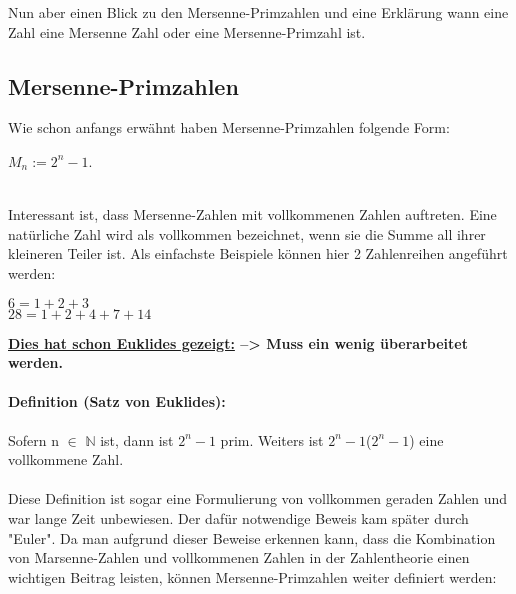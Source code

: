 \documentclass[german,12pt,a4paper]{article}
\begin{document}
Nun aber einen Blick zu den Mersenne-Primzahlen und eine Erklärung wann eine Zahl eine Mersenne Zahl oder eine Mersenne-Primzahl ist.

\subsection{Mersenne-Primzahlen}\label{Mersenne-Primzahlen}
Wie schon anfangs erwähnt haben Mersenne-Primzahlen folgende Form:\\
\begin{center}
$M_n := 2^{n}-1$.
\end{center}\
\\Interessant ist, dass Mersenne-Zahlen mit vollkommenen Zahlen auftreten.
Eine natürliche Zahl wird als vollkommen bezeichnet, wenn sie die Summe all ihrer kleineren Teiler ist.
Als einfachste Beispiele können hier 2 Zahlenreihen angeführt werden:
\begin{center}
$6 = 1+2+3$\\
$28 = 1+2+4+7+14$
\end{center}
\textbf{\underline{Dies hat schon Euklides gezeigt:} --> Muss ein wenig überarbeitet werden.}
\paragraph{Definition (Satz von Euklides):}
Sofern n $\in$ $\mathbb{N}$ ist, dann ist $2^{n}-1$ prim.
Weiters ist $2^{n}-1$($2^{n}-1$) eine vollkommene Zahl.\\
\\Diese Definition ist sogar eine Formulierung von vollkommen geraden Zahlen und war lange Zeit unbewiesen.
Der dafür notwendige Beweis kam später durch "{Euler}".
Da man aufgrund dieser Beweise erkennen kann, dass die Kombination von Marsenne-Zahlen und vollkommenen Zahlen in der Zahlentheorie einen wichtigen Beitrag leisten, können Mersenne-Primzahlen weiter definiert werden:
\end{document}

